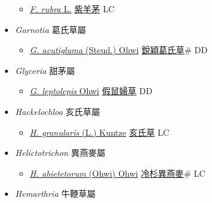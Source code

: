 \begin{itemize}
\begin{itemize}
        \item[] \href{http://www.theplantlist.org/tpl1.1/search?q=Festuca+rubra}{\textit{F. rubra} L.}   \href{\detokenize{http://taibnet.sinica.edu.tw/chi/taibnet_species_list.php?T2=紫羊茅&T2_new_value=true&fr=y}}{紫羊茅} LC
  \end{itemize}
 \item[] \textit{Garnotia} 葛氏草屬
                    
  \begin{itemize}
        \item[] \href{http://www.theplantlist.org/tpl1.1/search?q=Garnotia+acutigluma}{\textit{G. acutigluma} (Steud.) Ohwi}   \href{\detokenize{http://taibnet.sinica.edu.tw/chi/taibnet_species_list.php?T2=銳穎葛氏草&T2_new_value=true&fr=y}}{銳穎葛氏草}\# DD
  \end{itemize}
 \item[] \textit{Glyceria} 甜茅屬
                    
  \begin{itemize}
        \item[] \href{http://www.theplantlist.org/tpl1.1/search?q=Glyceria+leptolepis}{\textit{G. leptolepis} Ohwi}   \href{\detokenize{http://taibnet.sinica.edu.tw/chi/taibnet_species_list.php?T2=假鼠婦草&T2_new_value=true&fr=y}}{假鼠婦草} DD
  \end{itemize}
 \item[] \textit{Hackelochloa} 亥氏草屬
                    
  \begin{itemize}
        \item[] \href{http://www.theplantlist.org/tpl1.1/search?q=Hackelochloa+granularis}{\textit{H. granularis} (L.) Kuntze}   \href{\detokenize{http://taibnet.sinica.edu.tw/chi/taibnet_species_list.php?T2=亥氏草&T2_new_value=true&fr=y}}{亥氏草} LC
  \end{itemize}
 \item[] \textit{Helictotrichon} 異燕麥屬
                    
  \begin{itemize}
        \item[] \href{http://www.theplantlist.org/tpl1.1/search?q=Helictotrichon+abietetorum}{\textit{H. abietetorum} (Ohwi) Ohwi}   \href{\detokenize{http://taibnet.sinica.edu.tw/chi/taibnet_species_list.php?T2=冷杉異燕麥&T2_new_value=true&fr=y}}{冷杉異燕麥}\# LC
  \end{itemize}
 \item[] \textit{Hemarthria} 牛鞭草屬
                    

\end{itemize}
